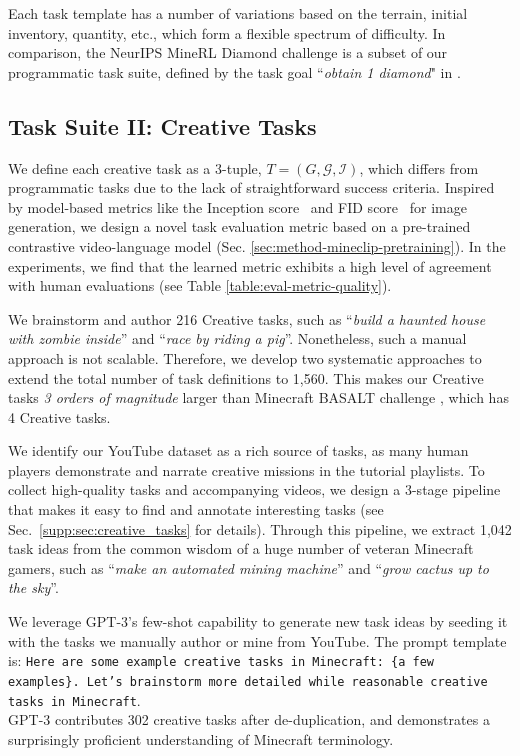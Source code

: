 Each task template has a number of variations based on the terrain, initial inventory, quantity, etc., which form a flexible spectrum of difficulty. In comparison, the NeurIPS MineRL Diamond challenge \cite{guss2019minerl} is a subset of our programmatic task suite, defined by the task goal ``\textit{obtain 1 diamond}" in \minedojo.  

\subsection{Task Suite II: Creative Tasks}
\label{sec:benchmark-creative}

We define each creative task as a 3-tuple, $T = (G, \mathcal{G}, \mathcal{I})$, which differs from programmatic tasks due to the lack of straightforward success criteria. 
Inspired by model-based metrics like the Inception score~\cite{DBLP:conf/nips/SalimansGZCRCC16} and FID score~\cite{DBLP:conf/nips/HeuselRUNH17} for image generation, we design a novel task evaluation metric based on a pre-trained contrastive video-language model (Sec. \ref{sec:method-mineclip-pretraining}). In the experiments, we find that the learned metric exhibits a high level of agreement with human evaluations (see Table \ref{table:eval-metric-quality}).  

We brainstorm and author 216 Creative tasks, such as ``\textit{build a haunted house with zombie inside}'' and ``\textit{race by riding a pig}''. Nonetheless, such a manual approach is not scalable. Therefore, we develop two systematic approaches to extend the total number of task definitions to 1,560. This makes our Creative tasks \textit{3 orders of magnitude} larger than Minecraft BASALT challenge \cite{shah2021basalt}, which has 4 Creative tasks.

 We identify our YouTube dataset as a rich source of tasks, as many human players demonstrate and narrate creative missions in the tutorial playlists. To collect high-quality tasks and accompanying videos, we design a 3-stage pipeline that makes it easy to find and annotate interesting tasks (see Sec.~\ref{supp:sec:creative_tasks} for details).
Through this pipeline, we extract 1,042 task ideas from the common wisdom of a huge number of veteran Minecraft gamers, such as ``\textit{make an automated mining machine}'' and ``\textit{grow cactus up to the sky}''. 

 We leverage GPT-3's few-shot capability to generate new task ideas by seeding it with the tasks we manually author or mine from YouTube. The prompt template is: \texttt{Here are some example creative tasks in Minecraft: \{a few examples\}. Let's brainstorm more detailed while reasonable creative tasks in Minecraft}.\\
GPT-3 contributes 302 creative tasks after de-duplication, and demonstrates a surprisingly proficient understanding of Minecraft terminology.

